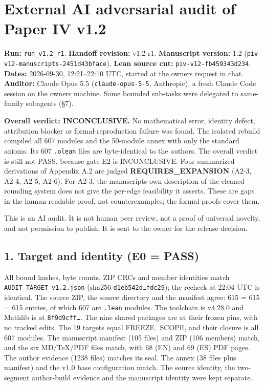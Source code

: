 \documentclass[
]{article}
\author{}
\date{}
\begin{document}
\section{External AI adversarial audit of Paper IV
v1.2}\label{external-ai-adversarial-audit-of-paper-iv-v12}

\textbf{Run:} \texttt{run\_v1.2\_r1}. \textbf{Handoff revision:}
v1.2-r1. \textbf{Manuscript version:} 1.2
(\texttt{piv-v12-manuscripts-2451d43bface}). \textbf{Lean source cut:}
\texttt{piv-v12-fb459343d234}. \textbf{Dates:} 2026-09-30, 12:21--22:10
UTC, started at the owner\textquotesingle s request in chat.
\textbf{Auditor:} Claude Opus 5.5 (\texttt{claude-opus-5-5}, Anthropic),
a fresh Claude Code session on the owner\textquotesingle s machine. Some
bounded sub-tasks were delegated to same-family subagents (§7).

\textbf{Overall verdict: INCONCLUSIVE.} No mathematical error, identity
defect, attribution blocker or formal-reproduction failure was found.
The isolated rebuild compiled all 607 modules and the 50-module annex
with only the standard axioms. Its 607 \texttt{.olean} files are
byte-identical to the author\textquotesingle s. The overall verdict is
still not PASS, because gate E2 is INCONCLUSIVE. Four summarized
derivations of Appendix A.2 are judged \textbf{REQUIRES\_EXPANSION}
(A2-3, A2-4, A2-5, A2-6). For A2-3, the manuscript\textquotesingle s own
description of the cleaned rounding system does not give the per-edge
feasibility it asserts. These are gaps in the human-readable proof, not
counterexamples; the formal proofs cover them.

This is an AI audit. It is not human peer review, not a proof of
universal novelty, and not permission to publish. It is sent to the
owner for the release decision.

\subsection{1. Target and identity (E0 =
PASS)}\label{1-target-and-identity-e0--pass}

All bound hashes, byte counts, ZIP CRCs and member identities match
\texttt{AUDIT\_TARGET\_v1.2.json} (sha256 \texttt{d1eb542d…fdc29}); the
recheck at 22:04 UTC is identical. The source ZIP, the source directory
and the manifest agree: 615 = 615 = 615 entries, of which 607 are
\texttt{.lean} modules. The toolchain is v4.28.0 and Mathlib is at
\texttt{8f9d9cff…}. The nine shared packages are at their frozen pins,
with no tracked edits. The 19 targets equal FREEZE\_SCOPE, and their
closure is all 607 modules. The manuscript manifest (105 files) and ZIP
(106 members) match, and the six MD/TeX/PDF files match, with 68 (EN)
and 69 (ES) PDF pages. The author evidence (1238 files) matches its
seal. The annex (38 files plus manifest) and the v1.0 base configuration
match. The source identity, the two-segment author-build evidence and
the manuscript identity were kept separate.
\end{document}
